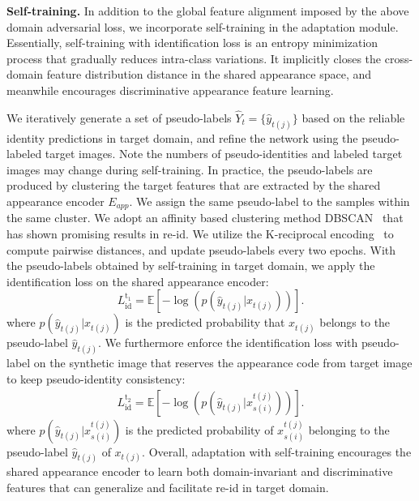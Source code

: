 \documentclass[runningheads]{llncs}
\begin{document}
\noindent\textbf{Self-training.}
In addition to the global feature alignment imposed by the above domain adversarial loss, we incorporate self-training in the adaptation module. Essentially, self-training with identification loss is an entropy minimization process that gradually reduces intra-class variations. It implicitly closes the cross-domain feature distribution distance in the shared appearance space, and meanwhile encourages discriminative appearance feature learning.

We iteratively generate a set of pseudo-labels $\hat{Y}_{t} = \{\hat{y}_{t(j)}\}$ based on the reliable identity predictions in target domain, and refine the network using the pseudo-labeled target images. Note the numbers of pseudo-identities and labeled target images may change during self-training. In practice, the pseudo-labels are produced by clustering the target features that are extracted by the shared appearance encoder $E_{app}$. We assign the same pseudo-label to the samples within the same cluster. We adopt an affinity based clustering method DBSCAN~\cite{ester1996density} that has shown promising results in re-id. We utilize the K-reciprocal encoding~\cite{zhong2017re} to compute pairwise distances, and update pseudo-labels every two epochs. With the pseudo-labels obtained by self-training in target domain, we apply the identification loss on the shared appearance encoder:
\begin{equation}
L^{\mathrm{t_1}}_{\mathrm{id}} = \mathbb{E}[-\log(p(\hat{y}_{t(j)}|x_{t(j)}))].
\end{equation}
\noindent where $p(\hat{y}_{t(j)}|x_{t(j)})$ is the predicted probability that $x_{t(j)}$ belongs to the pseudo-label $\hat{y}_{t(j)}$. We furthermore enforce the identification loss with pseudo-label on the synthetic image that reserves the appearance code from target image to keep pseudo-identity consistency:
\begin{align}
    L^{\mathrm{t_2}}_{\mathrm{id}} = \mathbb{E}[-\log(p(\hat{y}_{t(j)}|x^{t(j)}_{s(i)}))].
\end{align}
\noindent where $p(\hat{y}_{t(j)}|x^{t(j)}_{s(i)})$ is the predicted probability of $x^{t(j)}_{s(i)}$ belonging to the pseudo-label $\hat{y}_{t(j)}$ of $x_{t(j)}$. Overall, adaptation with self-training encourages the shared appearance encoder to learn both domain-invariant and discriminative features that can generalize and facilitate re-id in target domain. 
\end{document}
